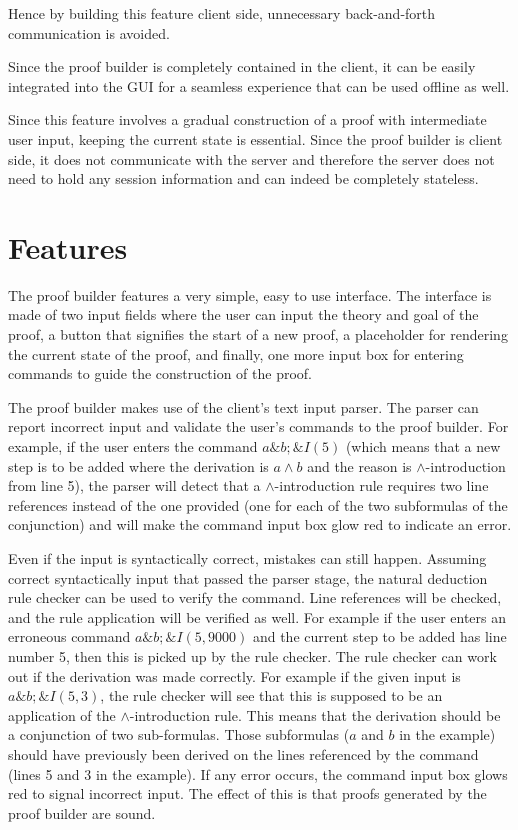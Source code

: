 \documentclass[11pt,twoside,a4paper]{report}
\begin{document}
Hence by building this feature client side, unnecessary back-and-forth communication is avoided. 

Since the proof builder is completely contained in the client, it can be easily integrated into the GUI for a seamless experience that can be used offline as well. 

Since this feature involves a gradual construction of a proof with intermediate user input, keeping the current state is essential. Since the proof builder is client side, it does not communicate with the server and therefore the server does not need to hold any session information and can indeed be completely stateless.

\section{Features}
The proof builder features a very simple, easy to use interface. The interface is made of two input fields where the user can input the theory and goal of the proof, a button that signifies the start of a new proof, a placeholder for rendering the current state of the proof, and finally, one more input box for entering commands to guide the construction of the proof.

The proof builder makes use of the client's text input parser. The parser can report incorrect input and validate the user's commands to the proof builder. For example, if the user enters the command $a\&b; \&I(5)$ (which means that a new step is to be added where the derivation is $a\wedge b$ and the reason is $\wedge$-introduction from line 5), the parser will detect that a $\wedge$-introduction rule requires two line references instead of the one provided (one for each of the two subformulas of the conjunction) and will make the command input box glow red to indicate an error.

Even if the input is syntactically correct, mistakes can still happen. Assuming correct syntactically input that passed the parser stage, the natural deduction rule checker can be used to verify the command. Line references will be checked, and the rule application will be verified as well. For example if the user enters an erroneous command $a\&b; \&I(5, 9000)$ and the current step to be added has line number 5, then this is picked up by the rule checker. The rule checker can work out if the derivation was made correctly. For example if the given input is $a\&b; \&I(5,3)$, the rule checker will see that this is supposed to be an application of the $\wedge$-introduction rule. This means that the derivation should be a conjunction of two sub-formulas. Those subformulas ($a$ and $b$ in the example) should have previously been derived on the lines referenced by the command (lines 5 and 3 in the example). If any error occurs, the command input box glows red to signal incorrect input. The effect of this is that proofs generated by the proof builder are sound.
\end{document}
